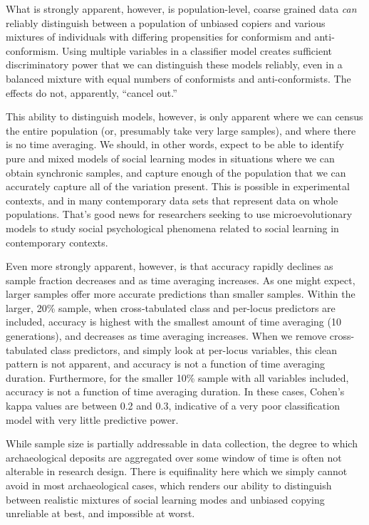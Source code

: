 What is strongly apparent, however, is population-level, coarse grained data \emph{can} reliably distinguish between a population of unbiased copiers and various mixtures of individuals with differing propensities for conformism and anti-conformism.  Using multiple variables in a classifier model creates sufficient discriminatory power that we can distinguish these models reliably, even in a balanced mixture with equal numbers of conformists and anti-conformists.  The effects do not, apparently, ``cancel out.''  

This ability to distinguish models, however, is only apparent where we can census the entire population (or, presumably take very large samples), and where there is no time averaging.  We should, in other words, expect to be able to identify pure and mixed models of social learning modes in situations where we can obtain synchronic samples, and capture enough of the population that we can accurately capture all of the variation present.  This is possible in experimental contexts, and in many contemporary data sets that represent data on whole populations.  That's good news for researchers seeking to use microevolutionary models to study social psychological phenomena related to social learning in contemporary contexts.

Even more strongly apparent, however, is that accuracy rapidly declines as sample fraction decreases and as time averaging increases.   As one might expect, larger samples offer more accurate predictions than smaller samples.  Within the larger, 20\% sample, when cross-tabulated class and per-locus predictors are included, accuracy is highest with the smallest amount of time averaging (10 generations), and decreases as time averaging increases.  When we remove cross-tabulated class predictors, and simply look at per-locus variables, this clean pattern is not apparent, and accuracy is not a function of time averaging duration.  Furthermore, for the smaller 10\% sample with all variables included, accuracy is not a function of time averaging duration.  In these cases, Cohen's kappa values are between 0.2 and 0.3, indicative of a very poor classification model with very little predictive power. 

While sample size is partially addressable in data collection, the degree to which archaeological deposits are aggregated over some window of time is often not alterable in research design.  There is equifinality here which we simply cannot avoid in most archaeological cases, which renders our ability to distinguish between realistic mixtures of social learning modes and unbiased copying unreliable at best, and impossible at worst.  

